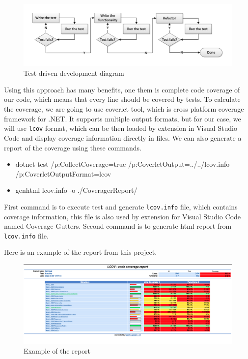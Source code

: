 \begin{figure}[H]
    \centering
    \includegraphics[width=\textwidth]{content/Test-Driven-Development-activities.png}
    \caption{Test-driven development diagram \cite{noauthor_continuous_2013}}
    \label{fig:tddDiagram}
\end{figure}

Using this approach has many benefits, one them is complete code coverage of our code, which means that every line should be covered by tests. To calculate
the coverage, we are going to use coverlet tool, which is cross platform coverage framework for .NET. \cite{noauthor_coverlet_2022} It supports multiple output
formats, but for our case, we will use \texttt{lcov} format, which can be then loaded by extension in Visual Studio Code and display coverage information directly in files.
We can also generate a report of the coverage using these commands.
\begin{itemize}
    \item {dotnet test /p:CollectCoverage=true /p:CoverletOutput=../../lcov.info /p:CoverletOutputFormat=lcov}
    \item {genhtml lcov.info -o ./CoveragerReport/}
\end{itemize}
First command is to execute test and generate \texttt{lcov.info} file, which contains coverage information, this file is also used by extension for Visual Studio Code
named Coverage Gutters.
Second command is to generate html report from \texttt{lcov.info} file.

Here is an example of the report from this project.

\begin{figure}[H]
    \centering
    \includegraphics[width=\textwidth]{content/coverage_report.png}
    \caption{Example of the report}
    \label{fig:report}
\end{figure}

